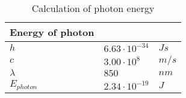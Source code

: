 \begin{table}[h]
\centering
\caption{Calculation of photon energy}
\label{tab:energy_photon}
\begin{tabular}{|l|ll|} \hline
\textbf{Energy of photon} &                     &       \\ \hline
$h$                       & $6.63\cdot10^{-34}$ & $Js$  \\
$c$                       & $3.00\cdot10^8$     & $m/s$ \\
$\lambda$                 & $850$               & $nm$  \\
$E_{photon}$              & $2.34\cdot10^{-19}$ & $J$   \\ \hline
\end{tabular}
\end{table}
